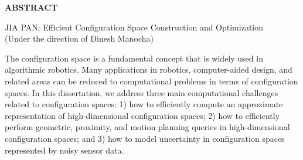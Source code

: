 \begin{center}
\vspace*{52pt}
{\textbf{ABSTRACT}}
\vspace{11pt}
\begin{singlespace}
JIA PAN: Efficient Configuration Space Construction and Optimization\\
(Under the direction of Dinesh Manocha)
\end{singlespace}
\end{center}

The configuration space is a fundamental concept that is widely used in algorithmic robotics. Many applications in robotics, computer-aided design, and related areas can be reduced to computational problems in terms of configuration spaces. In this dissertation, we address three main computational challenges related to configuration spaces: 1) how to efficiently compute an approximate representation of high-dimensional configuration spaces; 2) how to efficiently perform geometric, proximity, and motion planning queries in high-dimensional configuration spaces; and 3) how to model uncertainty in configuration spaces represented by noisy sensor data.


